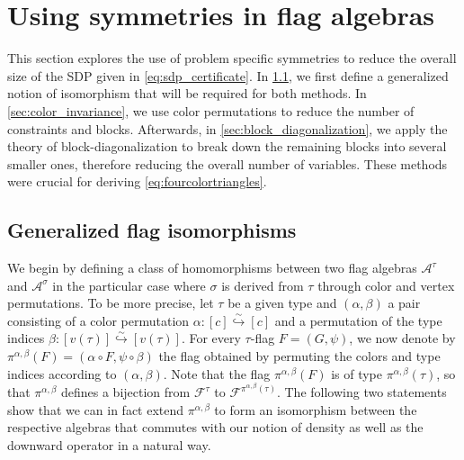 \documentclass[a4paper,11pt]{article}
\numberwithin{equation}{section}
\newcommand{\mA}{\mathcal{A}}
\newcommand{\mF}{\mathcal{F}}
\newcommand{\mH}{\mathcal{H}}
\begin{document}

\section{Using symmetries in flag algebras} \label{sec:improvements}

This section explores the use of problem specific symmetries to 
reduce the overall size 
of the SDP given in \cref{eq:sdp_certificate}. In \cref{eq:generalized_isomorphism}, we first define a generalized notion of isomorphism that will be required for both methods. In \cref{sec:color_invariance}, we use color permutations to reduce the number of constraints and blocks. Afterwards, in \cref{sec:block_diagonalization}, we apply the theory of block-diagonalization to break down the remaining blocks into several smaller ones, therefore reducing the overall number of variables. These methods were crucial for deriving \cref{eq:fourcolortriangles}.


\subsection{Generalized flag isomorphisms}\label{eq:generalized_isomorphism}

We begin by defining a class of homomorphisms between two flag algebras $\mA^\tau$ and $\mA^\sigma$ in the particular case where $\sigma$ is derived from $\tau$ through color and vertex permutations. To be more precise, let $\tau$ be a given type and $(\alpha, \beta)$ a pair consisting of a color permutation $\alpha: [c] \overset{\sim}{\hookrightarrow} [c]$ and a permutation of the type indices $\beta: [v(\tau)] \overset{\sim}{\hookrightarrow} [v(\tau)]$. For every $\tau$-flag $F = (G, \psi)$, we now denote by $\pi^{\alpha,\beta}(F) = (\alpha \circ F, \psi \circ \beta)$ the flag obtained by permuting the colors and type indices according to $(\alpha, \beta)$. Note that the flag $\pi^{\alpha,\beta}(F)$ is of type $\pi^{\alpha,\beta}(\tau)$, so that $\pi^{\alpha,\beta}$ defines a bijection from $\mF^\tau$ to $\mF^{\pi^{\alpha,\beta}(\tau)}$.
The following two statements show that we can in fact extend $\pi^{\alpha, \beta}$ to form an isomorphism between the respective algebras that commutes with our notion of density as well as the downward operator in a natural way.
\end{document}
